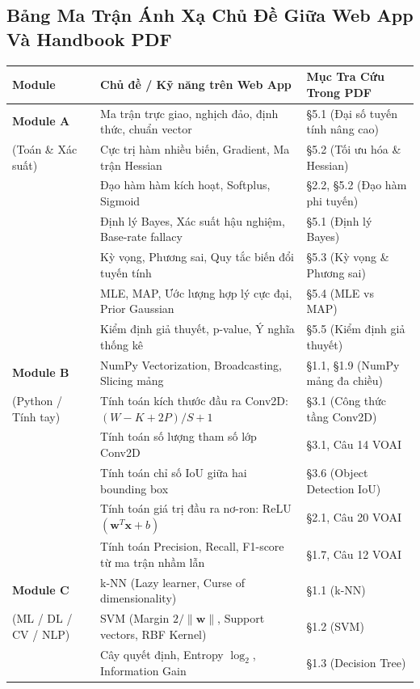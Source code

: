 \documentclass[10pt,a4paper]{article}
\begin{document}
\subsection{Bảng Ma Trận Ánh Xạ Chủ Đề Giữa Web App Và Handbook PDF}
\begin{center}
\small
\begin{tabularx}{\textwidth}{l p{7cm} X}
\toprule
\textbf{Module} & \textbf{Chủ đề / Kỹ năng trên Web App} & \textbf{Mục Tra Cứu Trong PDF} \\
\midrule
\textbf{Module A} & Ma trận trực giao, nghịch đảo, định thức, chuẩn vector & \S5.1 (Đại số tuyến tính nâng cao) \\
(Toán \& Xác suất) & Cực trị hàm nhiều biến, Gradient, Ma trận Hessian & \S5.2 (Tối ưu hóa \& Hessian) \\
& Đạo hàm hàm kích hoạt, Softplus, Sigmoid & \S2.2, \S5.2 (Đạo hàm phi tuyến) \\
& Định lý Bayes, Xác suất hậu nghiệm, Base-rate fallacy & \S5.1 (Định lý Bayes) \\
& Kỳ vọng, Phương sai, Quy tắc biến đổi tuyến tính & \S5.3 (Kỳ vọng \& Phương sai) \\
& MLE, MAP, Ước lượng hợp lý cực đại, Prior Gaussian & \S5.4 (MLE vs MAP) \\
& Kiểm định giả thuyết, p-value, Ý nghĩa thống kê & \S5.5 (Kiểm định giả thuyết) \\
\midrule
\textbf{Module B} & NumPy Vectorization, Broadcasting, Slicing mảng & \S1.1, \S1.9 (NumPy mảng đa chiều) \\
(Python / Tính tay) & Tính toán kích thước đầu ra Conv2D: $(W - K + 2P)/S + 1$ & \S3.1 (Công thức tầng Conv2D) \\
& Tính toán số lượng tham số lớp Conv2D & \S3.1, Câu 14 VOAI \\
& Tính toán chỉ số IoU giữa hai bounding box & \S3.6 (Object Detection IoU) \\
& Tính toán giá trị đầu ra nơ-ron: ReLU$(\mathbf{w}^T \mathbf{x} + b)$ & \S2.1, Câu 20 VOAI \\
& Tính toán Precision, Recall, F1-score từ ma trận nhầm lẫn & \S1.7, Câu 12 VOAI \\
\midrule
\textbf{Module C} & k-NN (Lazy learner, Curse of dimensionality) & \S1.1 (k-NN) \\
(ML / DL / CV / NLP) & SVM (Margin $2/\|\mathbf{w}\|$, Support vectors, RBF Kernel) & \S1.2 (SVM) \\
& Cây quyết định, Entropy $\log_2$, Information Gain & \S1.3 (Decision Tree) \\

\end{tabularx}
\end{center}
\end{document}
